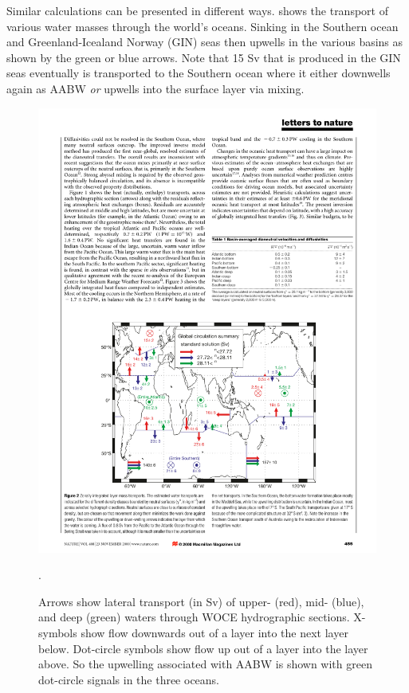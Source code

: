 Similar calculations can be presented in different ways.   shows the transport of various water masses through the world's oceans.   Sinking in the Southern ocean and Greenland-Icealand Norway (GIN) seas then upwells in the various basins as shown by the green or blue arrows.  Note that 15 Sv that is produced in the GIN seas eventually is transported to the Southern ocean where it either downwells again as AABW \emph{or} upwells into the surface layer via mixing.  

\begin{figure}[hbt]
  \begin{center}
  \includegraphics{figs/WaterMasses/ganachaudwunsch00Fig2}
    \caption{Arrows show lateral transport (in Sv) of upper- (red), mid- (blue), and deep (green) waters through WOCE hydrographic sections.  X-symbols show flow downwards out of a layer into the next layer below.  Dot-circle symbols show flow up out of a layer into the layer above.  So the upwelling associated with AABW is shown with green dot-circle signals in the three oceans.  \citep{ganachaudwunsch00}}.  
    \label{fig:ganachaudwunschFig2}  
  \end{center}
\end{figure}


